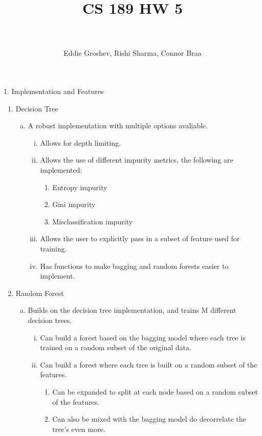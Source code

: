 \documentclass[paper=a4, fontsize=11pt]{scrartcl} %
\title{	
\normalfont \normalsize 
\horrule{0.5pt} \\[0.4cm] %
\huge CS 189 HW 5 \\ %
\horrule{2pt} \\[-0.1cm] %
}
\author{Eddie Groshev, Rishi Sharma, Connor Braa}
\numberwithin{equation}{section} %
\numberwithin{figure}{section} %
\numberwithin{table}{section} %
\begin{document}
	
\maketitle %


{\Large 1. \indent Implementation and Features}
\\
\begin{enumerate}[(1)]

\item Decision Tree
\begin{enumerate}[(a)]
\item A robust implementation with multiple options avaliable.
\begin{enumerate}[(i)]
\item Allows for depth limiting.
\item Allows the use of different impurity metrics, the following are implemented:
\begin{enumerate}[-]
\item Entropy impurity
\item Gini impurity
\item Misclassification impurity
\end{enumerate}
\item Allows the user to explicitly pass in a subset of feature used for training.
\item Has functions to make bagging and random forests easier to implement.
\end{enumerate}
\end{enumerate}


\item Random Forest
\begin{enumerate}[(a)]
\item Builds on the decision tree implementation, and trains M different decision trees.
\begin{enumerate}[(i)]
\item Can build a forest based on the bagging model where each tree is trained on a random subset of the original data.
\item Can build a forest where each tree is built on a random subset of the features.
\begin{enumerate}[-]
\item Can be expanded to split at each node based on a random subset of the features.
\item Can also be mixed with the bagging model do decorrelate the tree's even more.
\end{enumerate}
\end{enumerate}
\end{enumerate}


\end{enumerate}
\end{document}

